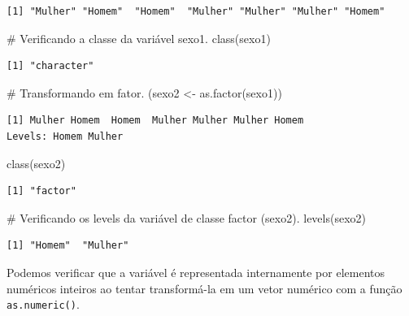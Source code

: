 \documentclass[
  letterpaper,
  DIV=11,
  numbers=noendperiod]{scrreprt}
\newenvironment{Shaded}{\begin{snugshade}}{\end{snugshade}}
\newcommand{\CommentTok}[1]{\textcolor[rgb]{0.37,0.37,0.37}{#1}}
\newcommand{\FunctionTok}[1]{\textcolor[rgb]{0.28,0.35,0.67}{#1}}
\newcommand{\NormalTok}[1]{\textcolor[rgb]{0.00,0.23,0.31}{#1}}
\newcommand{\OtherTok}[1]{\textcolor[rgb]{0.00,0.23,0.31}{#1}}
\begin{document}
\begin{verbatim}
[1] "Mulher" "Homem"  "Homem"  "Mulher" "Mulher" "Mulher" "Homem" 
\end{verbatim}

\begin{Shaded}
\begin{Highlighting}[]
\CommentTok{\# Verificando a classe da variável sexo1.}
\FunctionTok{class}\NormalTok{(sexo1)}
\end{Highlighting}
\end{Shaded}

\begin{verbatim}
[1] "character"
\end{verbatim}

\begin{Shaded}
\begin{Highlighting}[]
\CommentTok{\# Transformando em fator.}
\NormalTok{(sexo2 }\OtherTok{\textless{}{-}} \FunctionTok{as.factor}\NormalTok{(sexo1))}
\end{Highlighting}
\end{Shaded}

\begin{verbatim}
[1] Mulher Homem  Homem  Mulher Mulher Mulher Homem 
Levels: Homem Mulher
\end{verbatim}

\begin{Shaded}
\begin{Highlighting}[]
\FunctionTok{class}\NormalTok{(sexo2)}
\end{Highlighting}
\end{Shaded}

\begin{verbatim}
[1] "factor"
\end{verbatim}

\begin{Shaded}
\begin{Highlighting}[]
\CommentTok{\# Verificando os levels da variável de classe factor (sexo2).}
\FunctionTok{levels}\NormalTok{(sexo2)}
\end{Highlighting}
\end{Shaded}

\begin{verbatim}
[1] "Homem"  "Mulher"
\end{verbatim}

Podemos verificar que a variável é representada internamente por
elementos numéricos inteiros ao tentar transformá-la em um vetor
numérico com a função \texttt{as.numeric()}.
\end{document}
